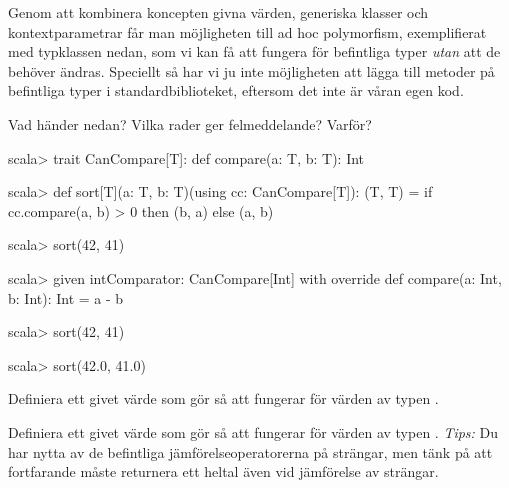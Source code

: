 Genom att kombinera koncepten givna värden, generiska klasser och kontextparametrar får man möjligheten till ad hoc polymorfism, exemplifierat med typklassen  nedan, som vi kan få att fungera för befintliga typer \emph{utan} att de behöver ändras. Speciellt så har vi ju inte möjligheten att lägga till metoder på befintliga typer i standardbiblioteket, eftersom det inte är våran egen kod.


\Subtask 
Vad händer nedan? Vilka rader ger felmeddelande? Varför?

\begin{REPL}
scala> trait CanCompare[T]:
         def compare(a: T, b: T): Int

scala> def sort[T](a: T, b: T)(using cc: CanCompare[T]): (T, T) =
         if cc.compare(a, b) > 0 then (b, a) else (a, b)

scala> sort(42, 41)

scala> given intComparator: CanCompare[Int] with
         override def compare(a: Int, b: Int): Int = a - b

scala> sort(42, 41)

scala> sort(42.0, 41.0)
\end{REPL}

\Subtask Definiera ett givet värde som gör så att  fungerar för värden av typen .

\Subtask Definiera ett givet värde som gör så att  fungerar för värden av typen . \emph{Tips:} Du har nytta av de befintliga jämförelseoperatorerna på strängar, men tänk på att  fortfarande måste returnera ett heltal även vid jämförelse av strängar.


\SOLUTION


\TaskSolved \what

\SubtaskSolved 

